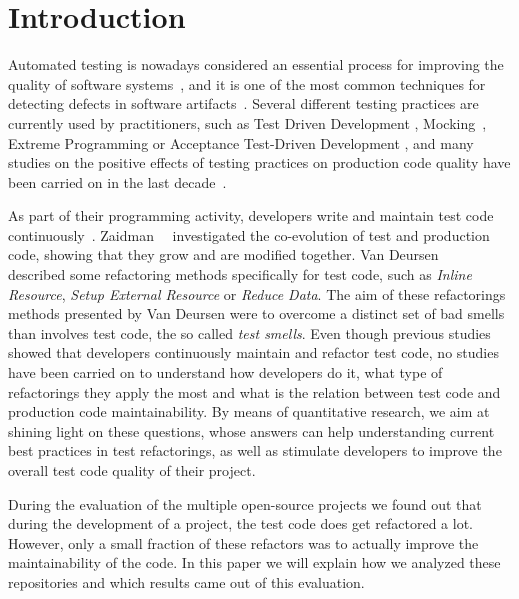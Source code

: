 
\section{Introduction}
Automated testing is nowadays considered an essential process for 
improving the quality of software systems~\cite{Bertolino2007,Myers2004}, and it is
one of the most common techniques for detecting defects in 
software artifacts~\cite{laitenberger1998studying,van2001refactoring}.
Several different testing
practices are currently used by practitioners, such as Test Driven Development
\cite{erdogmus2010test}, Mocking~\cite{Spadini}, Extreme Programming \cite{lindstrom2004extreme} or
Acceptance Test-Driven Development \cite{aggarwal2014acceptance}, and many studies on the 
positive effects of testing practices on production code quality have
been carried on in the last decade~\cite{laitenberger1998studying,binder1996testing}. 

As part of their programming activity, developers write and maintain test code 
continuously~\cite{van2001refactoring}. Zaidman~\etal~\cite{Zaidman2008} investigated the
co-evolution of test and production code, showing that they grow and are modified together.
Van Deursen~\etal~\cite{van2001refactoring} described some refactoring methods 
specifically for test code, such as \textit{Inline Resource}, \textit{Setup External Resource}
or \textit{Reduce Data}. The aim of these refactorings methods presented by Van Deursen were
to overcome a distinct set of bad smells than involves test code, the so called \textit{test smells}.
Even though previous studies showed that developers continuously maintain and refactor test code, 
no studies have been carried on to understand how developers do it, what type of refactorings they apply the most
and what is the relation between test code and production code maintainability. 
By means of quantitative research, we aim at shining light on these questions, whose answers
can help understanding current best practices in test refactorings, as well as
stimulate developers to improve the overall test code quality of their project.

During the evaluation of the multiple open-source projects we found out that
during the development of a project, the test code does get refactored a lot.
However, only a small fraction of these refactors was to actually improve the
maintainability of the code. In this paper we will explain how we analyzed these
repositories and which results came out of this evaluation.
